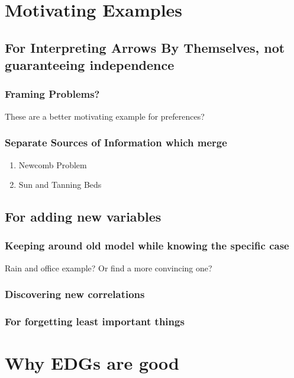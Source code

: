 \documentclass[11pt]{article}
\author{Oliver}
\date{\today}
\title{}
\begin{document}
\tableofcontents

\section{Motivating Examples}
\label{sec:orgc34e51f}

\subsection{For Interpreting Arrows By Themselves, not guaranteeing independence}
\label{sec:org4e68bd2}
\subsubsection{Framing Problems?}
\label{sec:org79f8c21}
These are a better motivating example for preferences?

\subsubsection{Separate Sources of Information which merge}
\label{sec:orga594586}
\begin{enumerate}
\item Newcomb Problem
\label{sec:org8be0808}
\item Sun and Tanning Beds
\label{sec:orgf02b7ec}
\end{enumerate}

\subsection{For adding new variables}
\label{sec:orge4c6517}

\subsubsection{Keeping around old model while knowing the specific case}
\label{sec:org9c823b4}
Rain and office example? Or find a more convincing one?

\subsubsection{Discovering new correlations}
\label{sec:orgd8b07e8}
\subsubsection{For forgetting least important things}
\label{sec:orged40235}


\section{Why EDGs are good}
\label{sec:org5c3d212}
\end{document}
